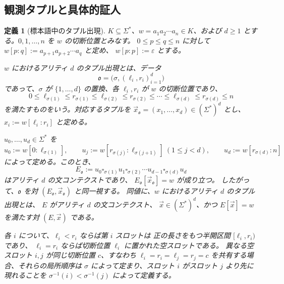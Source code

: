 \documentclass[11pt,a4paper]{ltjsarticle}
\newtheorem{definition}[theorem]{定義}
\theoremstyle{remark}
\newcommand{\tuple}[1]{\vec{#1}}
\newcommand{\blank}{\square}
\newcommand{\eps}{\varepsilon}
\begin{document}
\subsection{観測タプルと具体的証人}

\begin{definition}[標本語中のタプル出現]
\label{def:tuple-occurrence}
\(K\subseteq\Sigma^*\)、\(w=a_1a_2\cdots a_n\in K\)、および
\(d\ge1\) とする。\(0,1,\ldots,n\) を \(w\) の切断位置とみなす。
\(0\le p\le q\le n\) に対して
\(w[p:q]:=a_{p+1}a_{p+2}\cdots a_q\) と定め、
\(w[p:p]:=\eps\) とする。

\(w\) における\emph{アリティ \(d\) のタプル出現}とは、データ
\[
  \mathfrak o=\bigl(\sigma,(\ell_i,r_i)_{i=1}^d\bigr)
\]
であって、\(\sigma\) が \(\{1,\ldots,d\}\) の置換、各
\(\ell_i,r_i\) が \(w\) の切断位置であり、
\[
  0\le \ell_{\sigma(1)}\le r_{\sigma(1)}\le
  \ell_{\sigma(2)}\le r_{\sigma(2)}\le\cdots\le
  \ell_{\sigma(d)}\le r_{\sigma(d)}\le n
\]
を満たすものをいう。対応するタプルを
\(\tuple x_{\mathfrak o}=(x_1,\ldots,x_d)\in(\Sigma^*)^d\) とし、
\(x_i:=w[\ell_i:r_i]\) と定める。

\(u_0,\ldots,u_d\in\Sigma^*\) を
\[
  u_0:=w[0:\ell_{\sigma(1)}],\qquad
  u_j:=w[r_{\sigma(j)}:\ell_{\sigma(j+1)}]\ (1\le j<d),\qquad
  u_d:=w[r_{\sigma(d)}:n]
\]
によって定める。このとき、
\[
  E_{\mathfrak o}:=
  u_0\blank_{\sigma(1)}u_1\blank_{\sigma(2)}\cdots
  u_{d-1}\blank_{\sigma(d)}u_d
\]
はアリティ \(d\) の文コンテクストであり、
\(E_{\mathfrak o}[\tuple x_{\mathfrak o}]=w\) が成り立つ。
したがって、\(\mathfrak o\) を対
\((E_{\mathfrak o},\tuple x_{\mathfrak o})\) と同一視する。
同値に、\(w\) におけるアリティ \(d\) のタプル出現とは、
\(E\) がアリティ \(d\) の文コンテクスト、
\(\tuple x\in(\Sigma^*)^d\)、かつ \(E[\tuple x]=w\) を満たす対
\((E,\tuple x)\) である。

各 \(i\) について、\(\ell_i<r_i\) ならば第 \(i\) スロットは
正の長さをもつ半開区間 \([\ell_i,r_i)\) であり、
\(\ell_i=r_i\) ならば切断位置 \(\ell_i\) に置かれた空スロットである。
異なる空スロット \(i,j\) が同じ切断位置 \(c\)、すなわち
\(\ell_i=r_i=\ell_j=r_j=c\) を共有する場合、それらの局所順序は
\(\sigma\) によって定まり、スロット \(i\) がスロット \(j\) より先に
現れることを \(\sigma^{-1}(i)<\sigma^{-1}(j)\) によって定義する。
\end{definition}
\end{document}
